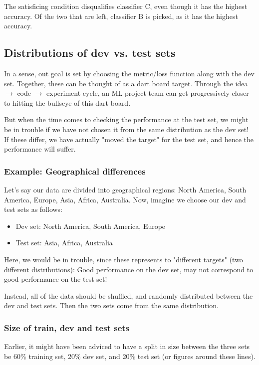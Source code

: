 \documentclass[12pt, a4paper]{article}
\numberwithin{equation}{section}
\begin{document}
The satisficing condition disqualifies classifier C, even though it has the highest accuracy. Of the two that are left, classifier B is picked, as it has the highest accuracy.

\subsection{Distributions of dev vs. test sets}
In a sense, out goal is set by choosing the metric/loss function along with the dev set. Together, these can be thought of as a dart board target. Through the idea $\rightarrow$ code $\rightarrow$ experiment cycle, an ML project team can get progressively closer to hitting the bullseye of this dart board.

But when the time comes to checking the performance at the test set, we might be in trouble if we have not chosen it from the same distribution as the dev set! If these differ, we have actually "moved the target" for the test set, and hence the performance will suffer.

\subsubsection{Example: Geographical differences}
Let's say our data are divided into geographical regions: North America, South America, Europe, Asia, Africa, Australia. Now, imagine we choose our dev and test sets as follows:
\begin{itemize}
\item Dev set: North America, South America, Europe
\item Test set: Asia, Africa, Australia
\end{itemize}
Here, we would be in trouble, since these represents to "different targets" (two different distributions): Good performance on the dev set, may not correspond to good performance on the test set!

Instead, all of the data should be shuffled, and randomly distributed between the dev and test sets. Then the two sets come from the same distribution.

\subsubsection{Size of train, dev and test sets}
Earlier, it might have been adviced to have a split in size between the three sets be 60\% training set, 20\% dev set, and 20\% test set (or figures around these lines).
\end{document}
